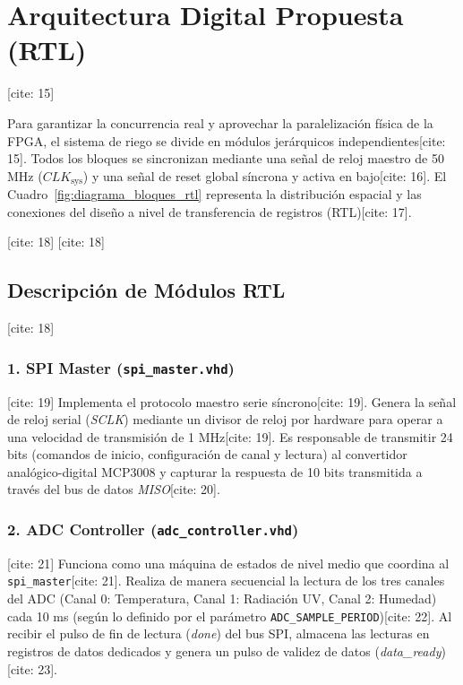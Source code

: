 \section{Arquitectura Digital Propuesta (RTL)} [cite: 15]

Para garantizar la concurrencia real y aprovechar la paralelización física de la FPGA, el sistema de riego se divide en módulos jerárquicos independientes[cite: 15]. Todos los bloques se sincronizan mediante una señal de reloj maestro de 50 MHz ($CLK_{\text{sys}}$) y una señal de reset global síncrona y activa en bajo[cite: 16]. El Cuadro~\ref{fig:diagrama_bloques_rtl} representa la distribución espacial y las conexiones del diseño a nivel de transferencia de registros (RTL)[cite: 17].

 [cite: 18]
\label{fig:diagrama_bloques_rtl} [cite: 18]

\subsection{Descripción de Módulos RTL} [cite: 18]

\subsubsection{1. SPI Master (\texttt{spi\_master.vhd})} [cite: 19]
Implementa el protocolo maestro serie síncrono[cite: 19]. Genera la señal de reloj serial (\textit{SCLK}) mediante un divisor de reloj por hardware para operar a una velocidad de transmisión de 1 MHz[cite: 19]. Es responsable de transmitir 24 bits (comandos de inicio, configuración de canal y lectura) al convertidor analógico-digital MCP3008 y capturar la respuesta de 10 bits transmitida a través del bus de datos \textit{MISO}[cite: 20].

\subsubsection{2. ADC Controller (\texttt{adc\_controller.vhd})} [cite: 21]
Funciona como una máquina de estados de nivel medio que coordina al \texttt{spi\_master}[cite: 21]. Realiza de manera secuencial la lectura de los tres canales del ADC (Canal 0: Temperatura, Canal 1: Radiación UV, Canal 2: Humedad) cada 10 ms (según lo definido por el parámetro \texttt{ADC\_SAMPLE\_PERIOD})[cite: 22]. Al recibir el pulso de fin de lectura (\textit{done}) del bus SPI, almacena las lecturas en registros de datos dedicados y genera un pulso de validez de datos (\textit{data\_ready})[cite: 23].

